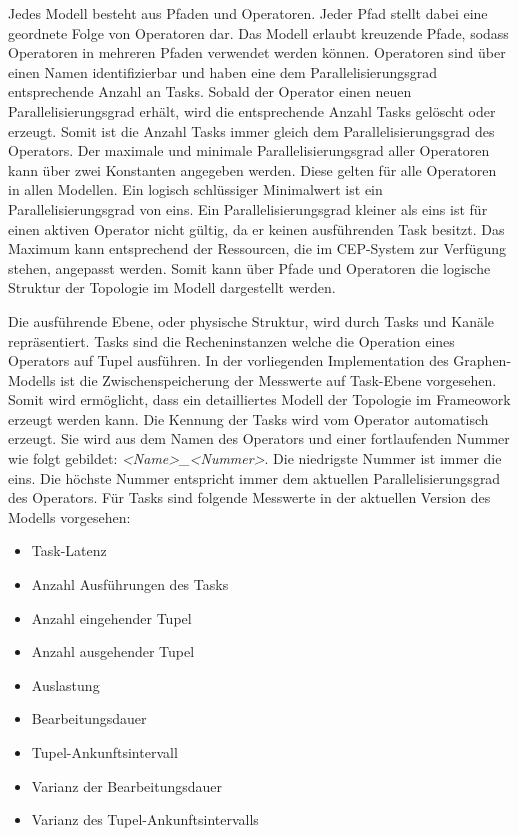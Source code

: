 Jedes Modell besteht aus Pfaden und Operatoren.
Jeder Pfad stellt dabei eine geordnete Folge von Operatoren dar.
Das Modell erlaubt kreuzende Pfade, sodass Operatoren in mehreren Pfaden verwendet werden können.
Operatoren sind über einen Namen identifizierbar und haben eine dem Parallelisierungsgrad entsprechende Anzahl an Tasks.
Sobald der Operator einen neuen Parallelisierungsgrad erhält, wird die entsprechende Anzahl Tasks gelöscht oder erzeugt.
Somit ist die Anzahl Tasks immer gleich dem Parallelisierungsgrad des Operators.
Der maximale und minimale Parallelisierungsgrad aller Operatoren kann über zwei Konstanten angegeben werden. 
Diese gelten für alle Operatoren in allen Modellen. 
Ein logisch schlüssiger Minimalwert ist ein Parallelisierungsgrad von eins.
Ein Parallelisierungsgrad kleiner als eins ist für einen aktiven Operator nicht gültig, da er keinen ausführenden Task besitzt.
Das Maximum kann entsprechend der Ressourcen, die im CEP-System zur Verfügung stehen, angepasst werden.
Somit kann über Pfade und Operatoren die logische Struktur der Topologie im Modell dargestellt werden.

Die ausführende Ebene, oder physische Struktur, wird durch Tasks und Kanäle repräsentiert.
Tasks sind die Recheninstanzen welche die Operation eines Operators auf Tupel ausführen.
In der vorliegenden Implementation des Graphen-Modells ist die Zwischenspeicherung der Messwerte auf Task-Ebene vorgesehen.
Somit wird ermöglicht, dass ein detailliertes Modell der Topologie im Frameowork erzeugt werden kann.
Die Kennung der Tasks wird vom Operator automatisch erzeugt.
Sie wird aus dem Namen des Operators und einer fortlaufenden Nummer wie folgt gebildet: \textit{<Name>\_<Nummer>}.
Die niedrigste Nummer ist immer die eins.
Die höchste Nummer entspricht immer dem aktuellen Parallelisierungsgrad des Operators.
Für Tasks sind folgende Messwerte in der aktuellen Version des Modells vorgesehen:

\begin{itemize}
\item{Task-Latenz}
\item{Anzahl Ausführungen des Tasks}
\item{Anzahl eingehender Tupel}
\item{Anzahl ausgehender Tupel}
\item{Auslastung}
\item{Bearbeitungsdauer}
\item{Tupel-Ankunftsintervall}
\item{Varianz der Bearbeitungsdauer}
\item{Varianz des Tupel-Ankunftsintervalls}
\end{itemize}

